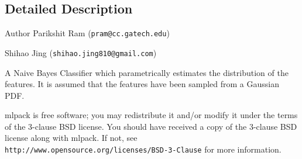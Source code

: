 \subsection{Detailed Description}
\begin{DoxyAuthor}{Author}
Parikshit Ram ({\tt pram@cc.\+gatech.\+edu}) 

Shihao Jing ({\tt shihao.\+jing810@gmail.\+com})
\end{DoxyAuthor}
A Naive Bayes Classifier which parametrically estimates the distribution of the features. It is assumed that the features have been sampled from a Gaussian P\+DF.

mlpack is free software; you may redistribute it and/or modify it under the terms of the 3-\/clause B\+SD license. You should have received a copy of the 3-\/clause B\+SD license along with mlpack. If not, see {\tt http\+://www.\+opensource.\+org/licenses/\+B\+S\+D-\/3-\/\+Clause} for more information. 